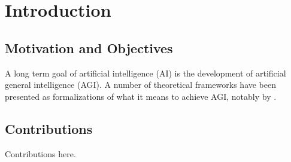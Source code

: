 \chapter{Introduction}

\section{Motivation and Objectives}

A long term goal of artificial intelligence (AI) is the development of artificial general intelligence (AGI). 	A number of theoretical frameworks have been presented as formalizations of what it means to achieve AGI, notably by \cite{Hutter2005}.


\section{Contributions}

Contributions here.